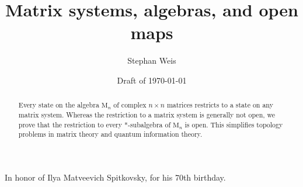 \documentclass[a4paper,11pt,reqno]{amsart}
\newcommand{\M}{\mathrm{M}}
\theoremstyle{definition}
\theoremstyle{remark}
\numberwithin{equation}{section}
\begin{document}
%
%
\title{Matrix systems, algebras, and open maps}
%
\author{Stephan Weis}
%
\begin{abstract}
Every state on the algebra $\M_n$ of complex $n\times n$ matrices restricts 
to a state on any matrix system. Whereas the restriction to a matrix system 
is generally not open, we prove that the restriction to every *-subalgebra 
of $\M_n$ is open. This simplifies topology problems in matrix theory and 
quantum information theory.
\end{abstract}
%
\date{Draft of \today}
%
%
%
\maketitle
%
%
%
%
\hfill
In honor of Ilya Matveevich Spitkovsky, for his 70th birthday.
\par
%
%
%
\end{document}
